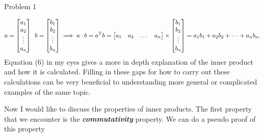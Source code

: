 \begin{problem}{Problem 1}
\begin{highlight}
        \begin{equation}
            a = 
            \begin{bmatrix}
                a_{1} \\
                a_{2} \\
                \vdots \\
                a_{n} \\
            \end{bmatrix}
            \hspace*{5pt}
            b = 
            \begin{bmatrix}
                b_{1} \\
                b_{2} \\
                \vdots \\
                b_{n} \\
            \end{bmatrix}
            \implies
            a \cdot b =
            a^{T}b = 
            \begin{bmatrix}
                a_{1} & a_{2} & \dots & a_{n} \\
            \end{bmatrix}
            \times
            \begin{bmatrix}
                b_{1} \\
                b_{2} \\
                \vdots \\
                b_{n} \\
            \end{bmatrix}
            = a_{1}b_{1} + a_{2}b_{2} + \dots + a_{n}b_{n}.
        \end{equation}
        Equation (6) in my eyes gives a more in depth explanation of the inner product and how it is calculated. Filling in these gaps for how to carry out these calculations can be very beneficial
        to understanding more general or complicated examples of the same topic.

        Now I would like to discuss the properties of inner products. The first property that we encounter is the \textbf{\textit{commutativity}} property. We can do a pseudo proof of this property


\end{highlight}
\end{problem}

